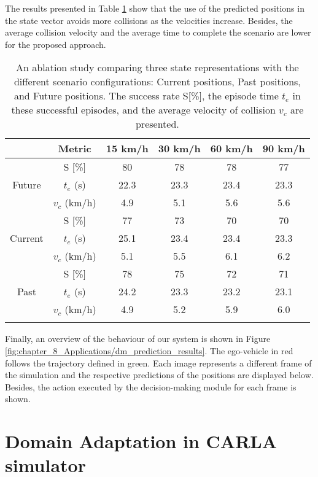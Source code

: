 The results presented in Table \ref{table:chapter_8_Applications/dm_ablation_study_smarts} show that the use of the predicted positions in the state vector avoids more collisions as the velocities increase. Besides, the average collision velocity and the average time to complete the scenario are lower for the proposed approach. 

\begin{table}[h]
	\centering
	\captionsetup{justification=justified}
	\caption{An ablation study comparing three state representations with the different scenario configurations: Current positions, Past positions, and Future positions. The success rate S[\%], the episode time $t_{e}$ in these successful episodes, and the average velocity of collision $v_{c}$ are presented.}
	\label{table:chapter_8_Applications/dm_ablation_study_smarts}
	\setlength{\extrarowheight}{2pt}
	\begin{tabular}{cccccc} 
		\ChangeRT{1pt}
		& Metric & 15 km/h & 30 km/h & 60 km/h & 90 km/h  \\
		\hline 
		\multirow{3}{*}{Future}
		&S [\%] & 80 & 78 & 78 & 77 \\ 
		&$t_{e}$ (s) & 22.3 & 23.3 & 23.4 & 23.3 \\
		&$v_{c}$ (km/h) & 4.9 & 5.1 & 5.6 & 5.6 \\
		\hline
		\multirow{3}{*}{Current}
		&S [\%] & 77 & 73 & 70 & 70 \\ 
		&$t_{e}$ (s) & 25.1 & 23.4 & 23.4 & 23.3 \\
		&$v_{c}$ (km/h) & 5.1 & 5.5 & 6.1 & 6.2 \\
		\hline
		\multirow{3}{*}{Past}
		&S [\%] & 78 & 75 & 72 & 71 \\ 
		&$t_{e}$ (s) & 24.2 & 23.3 & 23.2 & 23.1 \\
		&$v_{c}$ (km/h) & 4.9 & 5.2 & 5.9 & 6.0 \\
		\hline
		\ChangeRT{1pt}
	\end{tabular}
\end{table}

Finally, an overview of the behaviour of our system is shown in Figure \ref{fig:chapter_8_Applications/dm_prediction_results}. The ego-vehicle in red follows the trajectory defined in green. Each image represents a different frame of the simulation and the respective predictions of the positions are displayed below. Besides, the action executed by the decision-making module for each frame is shown.

\section{Domain Adaptation in CARLA simulator}
\label{sec:8_domain_adaptation_carla}


